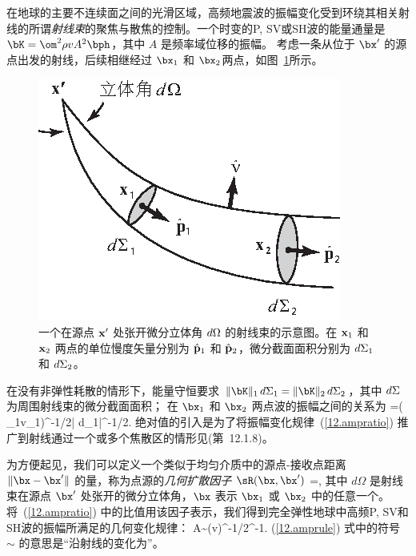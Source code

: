 在地球的主要不连续面之间的光滑区域，高频地震波的振幅变化受到环绕其相关射线的所谓{\em 射线束\/}的聚焦与散焦的控制。一个时变的P, SV或SH波的能量通量是 $\bK=\om^2\rho v A^2\bph$，其中 $A$ 是频率域位移的振幅。
考虑一条从位于 $\bx'$ 的源点出发的射线，后续相继经过
$\bx_1$ 和 $\bx_2$两点，如图~\ref{12.fig.raytube}所示。
\begin{figure}
\begin{center}
\includegraphics{../figures/chap12/fig07.eps}
\end{center}
\caption[raytubecartoon]{\label{12.fig.raytube}
一个在源点 ${\bf x}'$ 处张开微分立体角 $d\/\Omega$ 的射线束的示意图。在
${\bf x}_1$ 和 ${\bf x}_2$ 两点的单位慢度矢量分别为 $\hat{\bf p}_1$ 和 $\hat{\bf p}_2$，微分截面面积分别为
$d\/\Sigma_1$ 和 $d\/\Sigma_2$。}
\end{figure}
在没有非弹性耗散的情形下，能量守恒要求
$\|\bK\|_1\,d\Sigma_1
=\|\bK\|_2\,d\Sigma_2$，其中 $d\/\Sigma$ 为周围射线束的微分截面面积；
在 $\bx_1$ 和 $\bx_2$ 两点波的振幅之间的关系为
\eq \label{12.ampratio}
=\left(
{\rho_1v_1}\right)^{-1/2}\left|
{d\Sigma_1}\right|^{-1/2}.
\en
绝对值的引入是为了将振幅变化规律~(\ref{12.ampratio}) 推广到射线通过一个或多个焦散区的情形见(第~12.1.8)。

为方便起见，我们可以定义一个类似于均匀介质中的源点-接收点距离 $\|\bx-\bx'\|$ 的量，称为点源的{\em 几何扩散因子\/} $\sR(\bx,\bx')$
% 
\eq \label{12.Rcodef}
\sR=,
\en
其中 $d\Omega$ 是射线束在源点 $\bx'$ 处张开的微分立体角，$\bx$ 表示
$\bx_1$ 或 $\bx_2$ 中的任意一个。将~(\ref{12.ampratio}) 中的比值用该因子表示，我们得到完全弹性地球中高频P, SV和SH波的振幅所满足的几何变化规律：
\eq \label{12.amprule}
A\sim(\rho v)^{-1/2}\sR^{-1}.
\en
(\ref{12.amprule}) 式中的符号 $\sim$ 的意思是“沿射线的变化为”。

